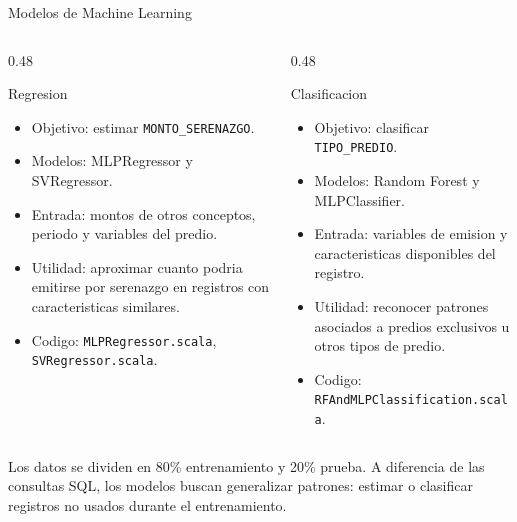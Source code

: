 \documentclass[aspectratio=169,11pt]{beamer}
\begin{document}
\begin{frame}{Modelos de Machine Learning}
    \begin{columns}[T,onlytextwidth]
        \begin{column}{0.48\textwidth}
            \begin{block}{Regresion}
                \begin{itemize}
                    \item Objetivo: estimar \texttt{MONTO\_SERENAZGO}.
                    \item Modelos: MLPRegressor y SVRegressor.
                    \item Entrada: montos de otros conceptos, periodo y variables del predio.
                    \item Utilidad: aproximar cuanto podria emitirse por serenazgo en registros con caracteristicas similares.
                    \item Codigo: \texttt{MLPRegressor.scala}, \texttt{SVRegressor.scala}.
                \end{itemize}
            \end{block}
        \end{column}
        \begin{column}{0.48\textwidth}
            \begin{block}{Clasificacion}
                \begin{itemize}
                    \item Objetivo: clasificar \texttt{TIPO\_PREDIO}.
                    \item Modelos: Random Forest y MLPClassifier.
                    \item Entrada: variables de emision y caracteristicas disponibles del registro.
                    \item Utilidad: reconocer patrones asociados a predios exclusivos u otros tipos de predio.
                    \item Codigo: \texttt{RFAndMLPClassification.scala}.
                \end{itemize}
            \end{block}
        \end{column}
    \end{columns}

    \vspace{0.15cm}
    \small
    Los datos se dividen en 80\% entrenamiento y 20\% prueba. A diferencia de las consultas SQL, los modelos buscan generalizar patrones: estimar o clasificar registros no usados durante el entrenamiento.
\end{frame}
\end{document}
